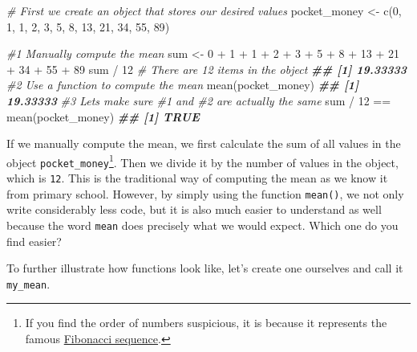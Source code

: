 \documentclass[
]{book}
\newenvironment{Shaded}{\begin{snugshade}}{\end{snugshade}}
\newcommand{\CommentTok}[1]{\textcolor[rgb]{0.56,0.35,0.01}{\textit{#1}}}
\newcommand{\DecValTok}[1]{\textcolor[rgb]{0.00,0.00,0.81}{#1}}
\newcommand{\DocumentationTok}[1]{\textcolor[rgb]{0.56,0.35,0.01}{\textbf{\textit{#1}}}}
\newcommand{\FunctionTok}[1]{\textcolor[rgb]{0.00,0.00,0.00}{#1}}
\newcommand{\NormalTok}[1]{#1}
\newcommand{\OtherTok}[1]{\textcolor[rgb]{0.56,0.35,0.01}{#1}}
\newcommand{\SpecialCharTok}[1]{\textcolor[rgb]{0.00,0.00,0.00}{#1}}
\begin{document}
\begin{Shaded}
\begin{Highlighting}[]
\CommentTok{\# First we create an object that stores our desired values}
\NormalTok{pocket\_money }\OtherTok{\textless{}{-}} \FunctionTok{c}\NormalTok{(}\DecValTok{0}\NormalTok{, }\DecValTok{1}\NormalTok{, }\DecValTok{1}\NormalTok{, }\DecValTok{2}\NormalTok{, }\DecValTok{3}\NormalTok{, }\DecValTok{5}\NormalTok{, }\DecValTok{8}\NormalTok{, }\DecValTok{13}\NormalTok{, }\DecValTok{21}\NormalTok{, }\DecValTok{34}\NormalTok{, }\DecValTok{55}\NormalTok{, }\DecValTok{89}\NormalTok{)}

\CommentTok{\#1 Manually compute the mean}
\NormalTok{sum }\OtherTok{\textless{}{-}} \DecValTok{0} \SpecialCharTok{+} \DecValTok{1} \SpecialCharTok{+} \DecValTok{1} \SpecialCharTok{+} \DecValTok{2} \SpecialCharTok{+} \DecValTok{3} \SpecialCharTok{+} \DecValTok{5} \SpecialCharTok{+} \DecValTok{8} \SpecialCharTok{+} \DecValTok{13} \SpecialCharTok{+} \DecValTok{21} \SpecialCharTok{+} \DecValTok{34} \SpecialCharTok{+} \DecValTok{55} \SpecialCharTok{+} \DecValTok{89}
\NormalTok{sum }\SpecialCharTok{/} \DecValTok{12} \CommentTok{\# There are 12 items in the object}
\DocumentationTok{\#\# [1] 19.33333}
\CommentTok{\#2 Use a function to compute the mean}
\FunctionTok{mean}\NormalTok{(pocket\_money)}
\DocumentationTok{\#\# [1] 19.33333}
\CommentTok{\#3 Let\textquotesingle{}s make sure \#1 and \#2 are actually the same}
\NormalTok{sum }\SpecialCharTok{/} \DecValTok{12} \SpecialCharTok{==} \FunctionTok{mean}\NormalTok{(pocket\_money)}
\DocumentationTok{\#\# [1] TRUE}
\end{Highlighting}
\end{Shaded}

If we manually compute the mean, we first calculate the sum of all values in the object \texttt{pocket\_money}\footnote{If you find the order of numbers suspicious, it is because it represents the famous \href{https://en.wikipedia.org/wiki/Fibonacci_number}{Fibonacci sequence}.}. Then we divide it by the number of values in the object, which is \texttt{12}. This is the traditional way of computing the mean as we know it from primary school. However, by simply using the function \texttt{mean()}, we not only write considerably less code, but it is also much easier to understand as well because the word \texttt{mean} does precisely what we would expect. Which one do you find easier?

To further illustrate how functions look like, let's create one ourselves and call it \texttt{my\_mean}.
\end{document}

